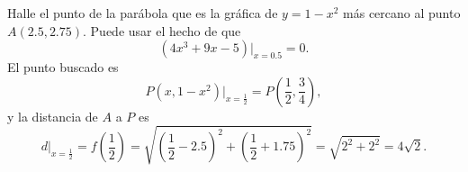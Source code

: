 \begin{exemplo}[Solución]{%
Halle el punto de la parábola que es la gráfica de $y = 1-x^2$ más cercano al punto
$A(2.5,2.75)$. Puede usar el hecho de que
\begin{equation*}
    (4x^3+9x-5)\Big |_{x=0.5}=0.
\end{equation*}
}
El punto buscado es
\begin{equation*}
   P(x,1-x^2)\Big|_{x=\frac{1}{2}}=  P\left(\frac{1}{2},\frac{3}{4}\right),
\end{equation*}
y la distancia de $A$ a $P$ es
\begin{equation*}
 d\Big|_{x=\frac{1}{2}} = f\left(\frac{1}{2}\right) =
 \sqrt{\left(\frac{1}{2}-2.5\right)^2 + \left( \frac{1}{2}+1.75\right)^2}=
 \sqrt{2^2+2^2} = 4\sqrt{2}.
\end{equation*}
\end{exemplo}


%
%
%
%
%
%
%
%
